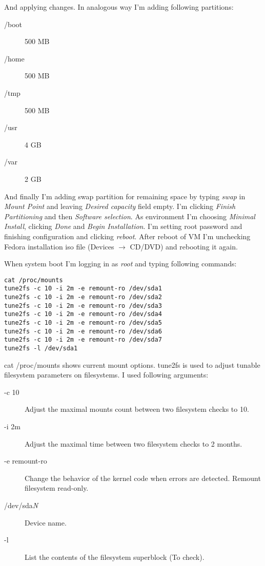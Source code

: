 \documentclass[a4paper,12pt]{article}
\begin{document}
    And applying changes. In analogous way I'm adding following partitions:
    \begin{description}
        \item [/boot] 500 MB
        \item [/home] 500 MB
        \item [/tmp] 500 MB
        \item [/usr] 4 GB
        \item [/var] 2 GB
    \end{description}
    And finally I'm adding swap partition for remaining space by typing \emph{swap} in \emph{Mount Point} and leaving \emph{Desired capacity} field empty.
    I'm clicking \emph{Finish Partitioning} and then \emph{Software selection}. As environment I'm choosing \emph{Minimal Install}, clicking \emph{Done} and \emph{Begin Installation}.
    I'm setting root password and finishing configuration and clicking \emph{reboot}. After reboot of VM I'm unchecking Fedora installation iso file (Devices $\rightarrow$ CD/DVD) and rebooting it again. 

    When system boot I'm logging in as \emph{root} and typing following commands: 
    \begin{lstlisting}[frame=single]
cat /proc/mounts
tune2fs -c 10 -i 2m -e remount-ro /dev/sda1
tune2fs -c 10 -i 2m -e remount-ro /dev/sda2
tune2fs -c 10 -i 2m -e remount-ro /dev/sda3
tune2fs -c 10 -i 2m -e remount-ro /dev/sda4
tune2fs -c 10 -i 2m -e remount-ro /dev/sda5
tune2fs -c 10 -i 2m -e remount-ro /dev/sda6
tune2fs -c 10 -i 2m -e remount-ro /dev/sda7
tune2fs -l /dev/sda1
    \end{lstlisting}
    cat /proc/mounts shows current mount options. tune2fs is used to adjust tunable filesystem parameters on filesystems. I used following arguments: 

    \begin{description}
        \item [-c 10] Adjust the maximal mounts count between two filesystem checks to 10.
        \item [-i 2m] Adjust the maximal time between two filesystem checks to 2 months.
        \item [-e remount-ro] Change the behavior of the kernel code when errors are detected. Remount filesystem read-only.
        \item [/dev/sda\emph{N}] Device name.
        \item [-l] List the contents of the filesystem superblock (To check).
    \end{description}
\end{document}
